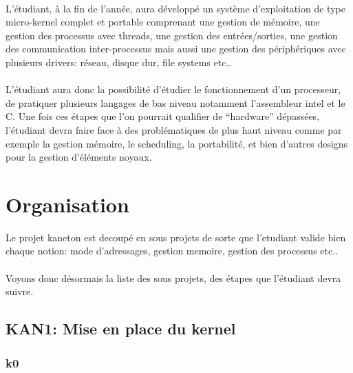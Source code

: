 \documentclass[10pt,a4wide]{article}
\begin{document}
\paragraph{}

L'\'etudiant, \`a la fin de l'ann\'ee, aura d\'evelopp\'e un syst\`eme
d'exploitation de type micro-kernel complet et portable comprenant une
gestion de m\'emoire, une gestion des processus avec threads, une gestion
des entr\'ees/sorties, une gestion des communication inter-processus
mais aussi une gestion des p\'eriph\'eriques avec plusieurs drivers:
r\'eseau, disque dur, file systems etc..

\paragraph{}

L'\'etudiant aura donc la possibilit\'e d'\'etudier le fonctionnement d'un
processeur, de pratiquer plusieurs langages de bas niveau notamment
l'assembleur intel et le C. Une fois ces \'etapes que l'on pourrait
qualifier de ``hardware'' d\'epass\'ees, l'\'etudiant devra faire face
\`a des probl\'ematiques de plus haut niveau comme par exemple la gestion
m\'emoire, le scheduling, la portabilit\'e, et bien d'autres designs pour la
gestion d'\'el\'ements noyaux.

\newpage

\section{Organisation}

Le projet kaneton est decoup\'e en sous projets de sorte que l'etudiant
valide bien chaque notion: mode d'adressages, gestion memoire, gestion
des processus etc..

\paragraph{}

Voyons donc d\'esormais la liste des sous projets, des \'etapes que
l'\'etudiant devra suivre.

\newpage

\subsection{KAN1: Mise en place du kernel}

\subsubsection{k0}
\end{document}
